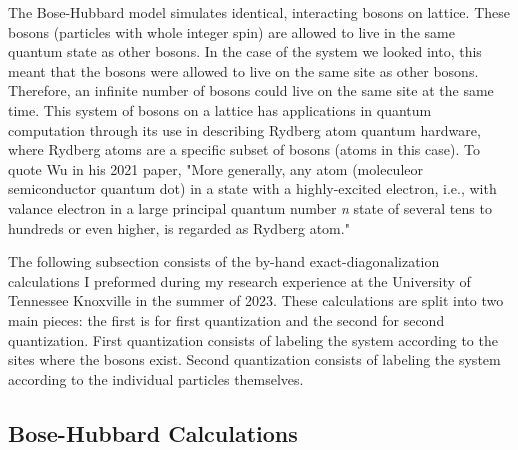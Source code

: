 The Bose-Hubbard model simulates identical, interacting bosons on lattice. These bosons (particles with whole integer spin) are allowed to live in the same quantum state as other bosons. In the case of the system we looked into, this meant that the bosons were allowed to live on the same site as other bosons. Therefore, an infinite number of bosons could live on the same site at the same time. This system of bosons on a lattice has applications in quantum computation through its use in describing Rydberg atom quantum hardware, where Rydberg atoms are a specific subset of bosons (atoms in this case). To quote Wu in his 2021 paper, "More generally, any atom (moleculeor semiconductor quantum dot) in a state with a highly-excited electron, i.e., with valance electron in a large principal quantum number \textit{n} state of several tens to hundreds or even higher, is regarded as Rydberg atom."\cite{wu_concise_2021}

The following subsection consists of the by-hand exact-diagonalization calculations I preformed during my research experience at the University of Tennessee Knoxville in the summer of 2023. These calculations are split into two main pieces: the first is for first quantization and the second for second quantization. First quantization consists of labeling the system according to the sites where the bosons exist. Second quantization consists of labeling the system according to the individual particles themselves.

\subsection{Bose-Hubbard Calculations} \label{calculations}
